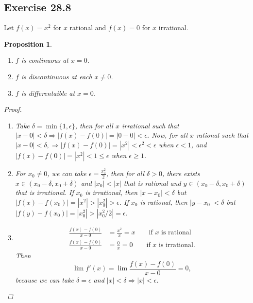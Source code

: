 \documentclass{article}
\newtheorem{proposition}[thm]{Proposition}
\renewcommand*{\implies}{\ensuremath{\Longrightarrow}}
\begin{document}
\newpage
\subsection*{Exercise 28.8}
Let $f(x)=x^2$ for $x$ rational and $f(x)=0$ for $x$ irrational.
\begin{proposition}
    \begin{enumerate}[label=\textbf{(\alph*)}]\indent
        \item $f$ is continuous at $x=0$.
        \item $f$ is discontinuous at each $x\neq 0$.
        \item $f$ is differentaible at $x=0$.
    \end{enumerate}
    \begin{proof}\indent
        \begin{enumerate}[label=\textbf{(\alph*)}]
            \item Take $\delta = \min\{1, \epsilon\}$, then for all $x$ irrational such that
            $|x-0|<\delta \implies |f(x)-f(0)|=|0-0|<\epsilon$. Now, for all $x$ rational such that 
            $|x-0|<\delta, \implies |f(x)-f(0)|=|x^2| < \epsilon^2<\epsilon$ when $\epsilon <1$, and 
            $|f(x)-f(0)|=|x^2|<1\le \epsilon$ when $\epsilon \ge 1$.

            \item For $x_0\neq 0$, we can take $\epsilon = \frac{x_0^2}{2}$, then for all $\delta>0$,
            there exists $x\in (x_0-\delta, x_0+\delta)$ and $|x_0|<|x|$ that is rational and $y\in (x_0-\delta, x_0+\delta)$ that is
            irrational. If $x_0$ is irrational, then $|x-x_0|<\delta$ but $|f(x)-f(x_0)|=|x^2|>|x_0^2|>\epsilon$.
            If $x_0$ is rational, then $|y-x_0|<\delta$ but $|f(y)-f(x_0)|=|x_0^2|>|x_0^2/2|=\epsilon$.

            \item 
            \begin{align*}
                \frac{f(x)-f(0)}{x-0} & = \frac{x^2}{x} =x \qquad \text{if $x$ is rational} \\
                \frac{f(x)-f(0)}{x-0} & = \frac{0}{x} = 0 \qquad \text{if $x$ is irrational}.
            \end{align*}
            Then $$\lim f'(x) =\lim \frac{f(x)-f(0)}{x-0} = 0,$$
            because we can take $\delta = \epsilon$ and $|x|<\delta\implies |x|<\epsilon$.
        \end{enumerate}
    \end{proof}
\end{proposition}
\end{document}
